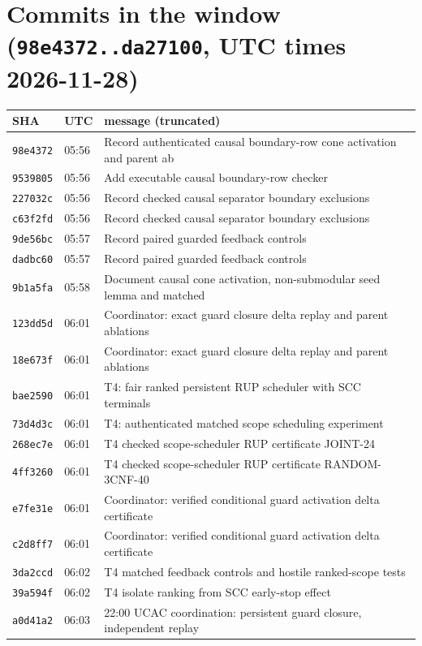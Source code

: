 \documentclass[11pt]{article}
\theoremstyle{definition}
\theoremstyle{remark}
\begin{document}
\appendix
\section{Commits in the window (\texttt{98e4372..da27100}, UTC times 2026-11-28)}\label{app:shas}
\begin{longtable}{llp{11.5cm}}
\toprule
SHA & UTC & message (truncated)\\
\midrule
\endhead
\texttt{98e4372} & 05:56 & Record authenticated causal boundary-row cone activation and parent ab\\
\texttt{9539805} & 05:56 & Add executable causal boundary-row checker\\
\texttt{227032c} & 05:56 & Record checked causal separator boundary exclusions\\
\texttt{c63f2fd} & 05:56 & Record checked causal separator boundary exclusions\\
\texttt{9de56bc} & 05:57 & Record paired guarded feedback controls\\
\texttt{dadbc60} & 05:57 & Record paired guarded feedback controls\\
\texttt{9b1a5fa} & 05:58 & Document causal cone activation, non-submodular seed lemma and matched\\
\texttt{123dd5d} & 06:01 & Coordinator: exact guard closure delta replay and parent ablations\\
\texttt{18e673f} & 06:01 & Coordinator: exact guard closure delta replay and parent ablations\\
\texttt{bae2590} & 06:01 & T4: fair ranked persistent RUP scheduler with SCC terminals\\
\texttt{73d4d3c} & 06:01 & T4: authenticated matched scope scheduling experiment\\
\texttt{268ec7e} & 06:01 & T4 checked scope-scheduler RUP certificate JOINT-24\\
\texttt{4ff3260} & 06:01 & T4 checked scope-scheduler RUP certificate RANDOM-3CNF-40\\
\texttt{e7fe31e} & 06:01 & Coordinator: verified conditional guard activation delta certificate\\
\texttt{c2d8ff7} & 06:01 & Coordinator: verified conditional guard activation delta certificate\\
\texttt{3da2ccd} & 06:02 & T4 matched feedback controls and hostile ranked-scope tests\\
\texttt{39a594f} & 06:02 & T4 isolate ranking from SCC early-stop effect\\
\texttt{a0d41a2} & 06:03 & 22:00 UCAC coordination: persistent guard closure, independent replay \\

\end{longtable}
\end{document}
